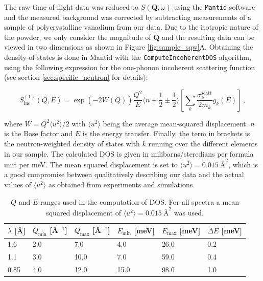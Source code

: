 The raw time-of-flight data was reduced to $S(\bm{Q},\omega)$ using the \texttt{Mantid} \cite{Arnold2014} software and the measured background was corrected by subtracting measurements of a sample of polycrystalline vanadium from our data. Due to the isotropic nature of the powder, we only consider the magnitude of $\bm{Q}$ and the resulting data can be viewed in two dimensions as shown in Figure \ref{fig:sample_sqw}A. Obtaining the density-of-states is done in Mantid with the \texttt{ComputeIncoherentDOS} \cite{mantid_dos} algorithm, using the following expression for the one-phonon incoherent scattering function (see section \ref{sec:specific_neutron} for details):

 \[ S^{(1)}_{\mathrm{inc}}(Q,E) = \exp\left(-2\bar{W}(Q)\right) \frac{Q^2}{E} \langle n+\frac{1}{2}\pm\frac{1}{2} \rangle \left[ \sum_k \frac{\sigma_k^{\mathrm{scatt}}}{2m_k} g_k(E) \right]\, , \]
 
 \noindent where $\bar{W} = Q^2 \langle u^2 \rangle / 2$ with $\langle u^2 \rangle$ being the average mean-squared displacement. $n$ is the Bose factor and $E$ is the energy transfer. Finally, the term in brackets is the neutron-weighted density of states with $k$ running over the different elements in our sample. The calculated DOS is given in milibarns/steredians per formula unit per meV. The mean squared displacement is set to $\langle u^2 \rangle = \SI{0.015}{\angstrom\squared}$, which is a good compromise between qualitatively describing our data and the actual values of $\langle u^2 \rangle$ as obtained from experiments \cite{Hafliger2014} and simulations.
 
 \begin{table}
    \caption[IN4: $Q$ and $E$ windows for DOS integration]{$Q$ and $E$-ranges used in the computation of DOS. For all spectra a mean squared displacement of $\langle u^2 \rangle = \SI{0.015}{\angstrom\squared}$ was used.}
    \label{tab:qeranges}
    \centering
    \begin{tabular}{llllll}
    \toprule
    $\lambda$ [\AA] & $Q_\text{min}$ [\AA$^{-1}$] & $Q_\text{max}$ [\AA$^{-1}$] & $E_\text{min}$ [meV] & $E_\text{max}$ [meV] & $\Delta E$ [meV] \\ \midrule
    1.6             & 2.0                         & 7.0                         & 4.0                  & 26.0                 & 0.2              \\
    1.1             & 3.0                         & 10.0                        & 7.0                  & 59.0                 & 0.4              \\
    0.85            & 4.0                         & 12.0                        & 15.0                 & 98.0                 & 1.0              \\ \bottomrule
    \end{tabular}
 \end{table}

